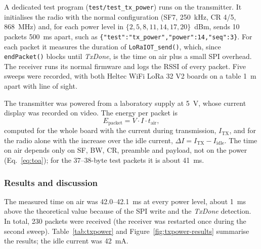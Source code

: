 \documentclass[informe,english]{plantilla}
\begin{document}
A dedicated test program (\texttt{test/test\_tx\_power}) runs on the transmitter. It initialises the radio with the normal configuration (SF7, 250~kHz, CR 4/5, 868~MHz) and, for each power level in $\{2, 5, 8, 11, 14, 17, 20\}$~dBm, sends 10 packets 500~ms apart, such as \texttt{\{"test":"tx\_power","power":14,"seq":3\}}. For each packet it measures the duration of \texttt{LoRaIOT\_send()}, which, since \texttt{endPacket()} blocks until \emph{TxDone}, is the time on air plus a small SPI overhead. The receiver runs its normal firmware and logs the RSSI of every packet. Five sweeps were recorded, with both Heltec WiFi LoRa 32 V2 boards on a table 1~m apart with line of sight.

The transmitter was powered from a laboratory supply at 5~V, whose current display was recorded on video. The energy per packet is
\begin{equation}
    E_{\text{packet}} = V \cdot I \cdot t_{\text{air}},
    \label{eq:energy}
\end{equation}
computed for the whole board with the current during transmission, $I_{\text{TX}}$, and for the radio alone with the increase over the idle current, $\Delta I = I_{\text{TX}} - I_{\text{idle}}$. The time on air depends only on SF, BW, CR, preamble and payload, not on the power (Eq.~\eqref{eq:toa}); for the 37--38-byte test packets it is about 41~ms.

\subsubsection{Results and discussion}

The measured time on air was 42.0--42.1~ms at every power level, about 1~ms above the theoretical value because of the SPI write and the \emph{TxDone} detection. In total, 230 packets were received (the receiver was restarted once during the second sweep). Table~\ref{tab:txpower} and Figure~\ref{fig:txpower-results} summarise the results; the idle current was 42~mA.
\end{document}
